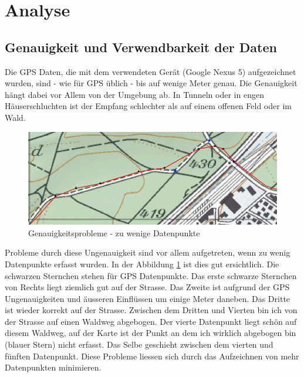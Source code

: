 \clearpage
\section{Analyse}
\subsection{Genauigkeit und Verwendbarkeit der Daten}
\label{subsec:analyseprecision}
Die GPS Daten, die mit dem verwendeten Gerät (Google Nexus 5) aufgezeichnet wurden, sind - wie für GPS üblich \cite{gpsprecision} - bis auf wenige Meter genau. Die Genauigkeit hängt dabei vor Allem von der Umgebung ab. In Tunneln oder in engen Häuserschluchten ist der Empfang schlechter als auf einem offenen Feld oder im Wald. 

\begin{figure}[h]
  \centering
  \includegraphics[width=\textwidth]{images/map_issues_10s.png}
  \caption[Genauigkeitsprobleme - zu wenige Datenpunkte]{Genauigkeitsprobleme - zu wenige Datenpunkte}
  \label{fig:precisionissues10s}
\end{figure}

Probleme durch diese Ungenauigkeit sind vor allem aufgetreten, wenn zu wenig Datenpunkte erfasst wurden. In der Abbildung \ref{fig:precisionissues10s} ist dies gut ersichtlich. Die schwarzen Sternchen stehen für GPS Datenpunkte. Das erste schwarze Sternchen von Rechts liegt ziemlich gut auf der Strasse. Das Zweite ist aufgrund der GPS Ungenauigkeiten und äusseren Einflüssen um einige Meter daneben. Das Dritte ist wieder korrekt auf der Strasse. Zwischen dem Dritten und Vierten bin ich von der Strasse auf einen Waldweg abgebogen. Der vierte Datenpunkt liegt schön auf diesem Waldweg, auf der Karte ist der Punkt an dem ich wirklich abgebogen bin (blauer Stern) nicht erfasst. Das Selbe geschieht zwischen dem vierten und fünften Datenpunkt. Diese Probleme liessen sich durch das Aufzeichnen von mehr Datenpunkten minimieren.

